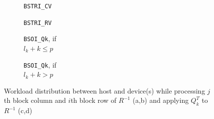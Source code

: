 \documentclass{llncs}
\begin{document}
\begin{figure}[t]%
  \centering

  \begin{subfigure}[t]{0.2\linewidth}
    \scalebox{0.59}{}
    \caption{{\tt BSTRI\_CV} \label{fig:BSTRI_CV_HostDevice_workload}}
  \end{subfigure}
  \begin{subfigure}[t]{0.4\linewidth}
    \scalebox{0.59}{}
    \caption{{\tt BSTRI\_RV}\label{fig:BSTRI_RV_HostDevice_workload}}
  \end{subfigure}
  \begin{subfigure}[t]{0.17\linewidth}
    \scalebox{0.59}{}
    \caption{{\tt BSOI\_Qk}, if \\$l_k + k \leq p$ \label{fig:BSOI_Qk_HostDevice_workload1}}
  \end{subfigure}
  \begin{subfigure}[t]{0.17\linewidth}
    \scalebox{0.59}{}
    \caption{{\tt BSOI\_Qk}, if \\$l_k + k > p$ \label{fig:BSOI_Qk_HostDevice_workload2}}
  \end{subfigure}

  \caption[]{Workload distribution between host and device(s) 
    while processing 
    $j$th block column and $i$th block row of $R^{-1}$ (a,b) 
    and applying $Q_k^T$ to $R^{-1}$ (c,d)\footnotemark}
  \label{fig:HostDevice_workload}
\end{figure}
\end{document}

